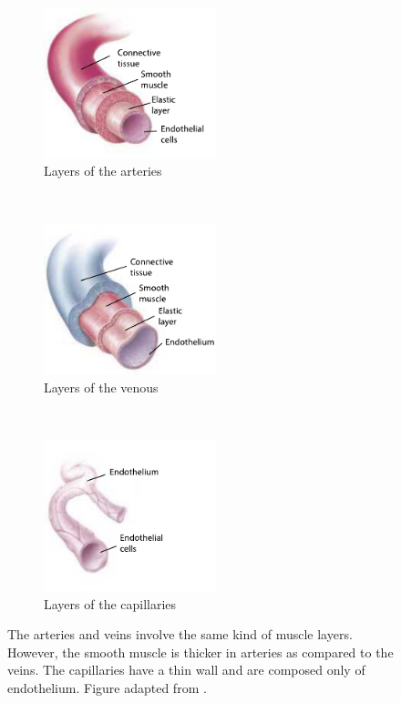 \begin{figure}[!htbp]
	\centering
	\begin{subfigure}[t]{0.33\textwidth}
		\centering
		\includegraphics[width=5cm]{figure1a}
		\caption{Layers of the arteries}
		\label{fig:arteries composition}
	\end{subfigure}%
	~ 
	\begin{subfigure}[t]{0.33\textwidth}
		\centering
		\includegraphics[width=5cm]{figure1c}
		\caption{Layers of the venous}
		\label{fig:veins composition}
	\end{subfigure}
	~ 
	\begin{subfigure}[t]{0.33\textwidth}
		\centering
		\includegraphics[width=5cm, trim={0 0 2cm 0},clip]{figure1b}
		\caption{Layers of the capillaries}
		\label{fig:capillaries composition}
	\end{subfigure}
	\caption[Layers of the blood vessels]{The arteries and veins involve the same kind of muscle layers. However, the smooth muscle is thicker in arteries as compared to the veins. The capillaries have a thin wall and are composed only of endothelium. Figure adapted from \cite{johnson2001biology}.}
	\label{fig:vessels composition}
\end{figure}

